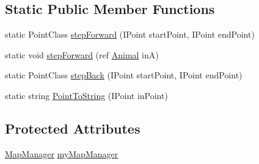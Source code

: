 \subsection*{Static Public Member Functions}
\begin{DoxyCompactItemize}
\item 
static Point\-Class \hyperlink{class_s_e_a_r_c_h_1_1_mover_a0f3de12a1d5f59f098be3220d98ebd62}{step\-Forward} (I\-Point start\-Point, I\-Point end\-Point)
\item 
static void \hyperlink{class_s_e_a_r_c_h_1_1_mover_a360265c7744b22b0dc484135b6b77dad}{step\-Forward} (ref \hyperlink{class_s_e_a_r_c_h_1_1_animal}{Animal} in\-A)
\item 
static Point\-Class \hyperlink{class_s_e_a_r_c_h_1_1_mover_a84c8c83bb560d911cb9681ff32b93383}{step\-Back} (I\-Point start\-Point, I\-Point end\-Point)
\item 
static string \hyperlink{class_s_e_a_r_c_h_1_1_mover_a69c5168d8551e5c51893a9cbea9c93d4}{Point\-To\-String} (I\-Point in\-Point)
\end{DoxyCompactItemize}
\subsection*{Protected Attributes}
\begin{DoxyCompactItemize}
\item 
\hyperlink{class_s_e_a_r_c_h_1_1_map_manager}{Map\-Manager} \hyperlink{class_s_e_a_r_c_h_1_1_mover_a6ea0ee67a11b4bfe8802ff096c53e908}{my\-Map\-Manager}
\end{DoxyCompactItemize}
